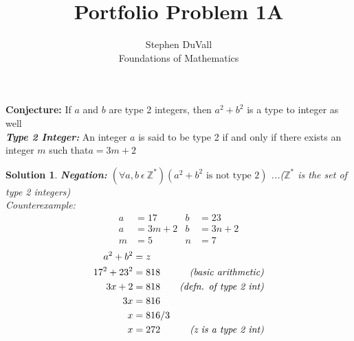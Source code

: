 \documentclass[12pt]{article}
\theoremstyle{mysolutionstyle}
\newtheorem*{soln}{Solution}
\begin{document}
\title{Portfolio Problem 1A}%
\author{Stephen DuVall \\ %
Foundations of Mathematics} %

\maketitle
\textbf{Conjecture:} If $a$ and $b$ are type 2 integers, then $a^2 + b^2$ is a type to integer as well \\
\textbf{\emph{Type 2 Integer:}} An integer $a$ is said to be type 2 if and only if there exists an integer $m$ such that$a = 3m + 2$
\hfill
\begin{soln} \textbf{Negation:} $(\forall a,b\ \epsilon\ \mathbb{Z}^*)(a^2 + b^2 \text{ is not type 2})$ ...($\mathbb{Z}^*$ is the set of type 2 integers) \\ 
\hfill
Counterexample:
\begin{align*}
	a &= 17	& b &= 23\\
	a &= 3m+2	& b &= 3n + 2\\
	m &= 5	& n &= 7
\end{align*}
\begin{align*}
	a^2 + b^2 &= z\\
	17^2 + 23^2 &= 818 	&\text{\emph{(basic arithmetic)}}\\
	3x + 2 &= 818 		&\text{\emph{(defn. of type 2 int)}}\\
	3x &= 816 \\ 
	x &= 816 / 3 \\
	x &= 272 			&\text{\emph{(z is a type 2 int)}}
\end{align*}
\end{soln}
\end{document}
